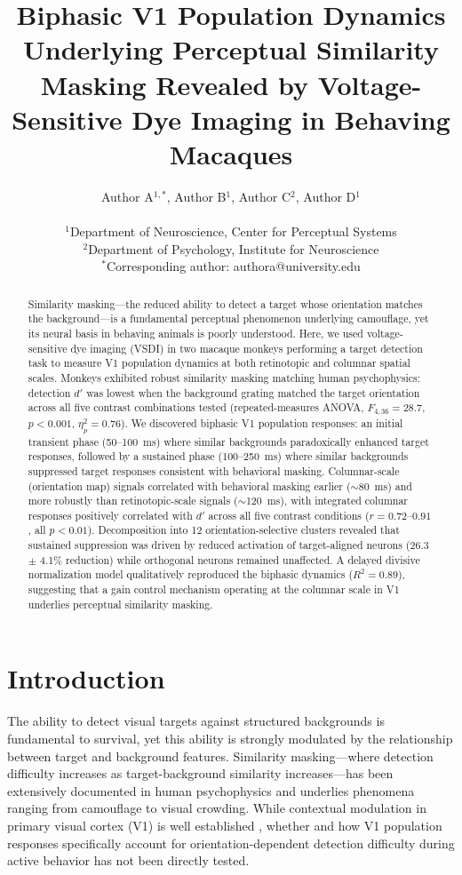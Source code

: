 \documentclass[11pt]{article}
\title{Biphasic V1 Population Dynamics Underlying Perceptual Similarity Masking Revealed by Voltage-Sensitive Dye Imaging in Behaving Macaques}
\author{
Author A$^{1,*}$, Author B$^{1}$, Author C$^{2}$, Author D$^{1}$ \\
\\
$^{1}$Department of Neuroscience, Center for Perceptual Systems \\
$^{2}$Department of Psychology, Institute for Neuroscience \\
$^{*}$Corresponding author: authora@university.edu
}
\date{}
\begin{document}
\maketitle

\begin{abstract}
Similarity masking---the reduced ability to detect a target whose orientation matches the background---is a fundamental perceptual phenomenon underlying camouflage, yet its neural basis in behaving animals is poorly understood. Here, we used voltage-sensitive dye imaging (VSDI) in two macaque monkeys performing a target detection task to measure V1 population dynamics at both retinotopic and columnar spatial scales. Monkeys exhibited robust similarity masking matching human psychophysics: detection $d'$ was lowest when the background grating matched the target orientation across all five contrast combinations tested (repeated-measures ANOVA, $F_{4,36}=28.7$, $p<0.001$, $\eta_p^2=0.76$). We discovered biphasic V1 population responses: an initial transient phase (50--100~ms) where similar backgrounds paradoxically enhanced target responses, followed by a sustained phase (100--250~ms) where similar backgrounds suppressed target responses consistent with behavioral masking. Columnar-scale (orientation map) signals correlated with behavioral masking earlier ($\sim$80~ms) and more robustly than retinotopic-scale signals ($\sim$120~ms), with integrated columnar responses positively correlated with $d'$ across all five contrast conditions ($r = 0.72$--$0.91$, all $p < 0.01$). Decomposition into 12 orientation-selective clusters revealed that sustained suppression was driven by reduced activation of target-aligned neurons (26.3 $\pm$ 4.1\% reduction) while orthogonal neurons remained unaffected. A delayed divisive normalization model qualitatively reproduced the biphasic dynamics ($R^2 = 0.89$), suggesting that a gain control mechanism operating at the columnar scale in V1 underlies perceptual similarity masking.
\end{abstract}

\section{Introduction}

The ability to detect visual targets against structured backgrounds is fundamental to survival, yet this ability is strongly modulated by the relationship between target and background features. Similarity masking---where detection difficulty increases as target-background similarity increases---has been extensively documented in human psychophysics \citep{foley1994, sebastian2017} and underlies phenomena ranging from camouflage to visual crowding. While contextual modulation in primary visual cortex (V1) is well established \citep{angelucci2017, cavanaugh2002}, whether and how V1 population responses specifically account for orientation-dependent detection difficulty during active behavior has not been directly tested.
\end{document}
